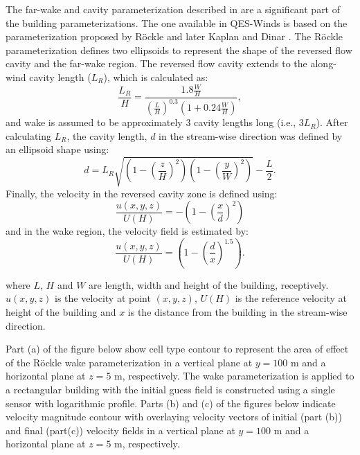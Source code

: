 The far-wake and cavity parameterization described in \cite{singh2005testing,singh2006testing} are a significant part of the building parameterizations. The one available in QES-Winds is based on the parameterization proposed by R\"{o}ckle \cite{rockle1990bestimmung} and later Kaplan and Dinar \cite{kaplan1996lagrangian}. The R\"{o}ckle parameterization defines two ellipsoids to represent the shape of the reversed flow cavity and the far-wake region. The reversed flow cavity extends to the along-wind cavity length
($L_R$), which is calculated as:
\begin{equation}
\frac{L_{R}}{H}=\frac{1.8 \frac{W}{H}}{\left(\frac{L}{H}\right)^{0.3}\left(1+0.24 \frac{W}{H}\right)},
\label{eq:Lr}
\end{equation}
and wake is assumed to be approximately $3$ cavity lengths long (i.e., $3L_R$). After calculating $L_R$, the cavity length, $d$ in the stream-wise direction was defined by an ellipsoid shape using:
\begin{equation}
d=L_{R} \sqrt{\left(1-\left(\frac{z}{H}\right)^{2}\right)\left(1-\left(\frac{y}{W}\right)^{2}\right)}-\frac{L}{2}.
\label{eq:d}
\end{equation}
Finally, the velocity in the reversed cavity zone is defined using:
\begin{equation}
\frac{u(x, y, z)}{U(H)}=-\left(1-\left(\frac{x}{d}\right)^{2}\right)
\label{eq:cavity}
\end{equation}
and in the wake region, the velocity field is estimated by:
\begin{equation}
\frac{u(x, y, z)}{U(H)}=\left(1-\left(\frac{d}{x}\right)^{1.5}\right).
\label{eq:wake}
\end{equation}

where $L$, $H$ and $W$ are length, width and height of the building, receptively. $u(x,y,z)$ is the velocity at point $(x,y,z)$, $U(H)$ is the reference velocity at height of the building and $x$ is the distance from the building in the stream-wise direction.

Part (a) of the figure below show cell type contour to represent the area of effect of the R\"{o}ckle wake parameterization in a vertical plane at $y=100$ m and a horizontal plane at $z=5$ m, respectively. The wake parameterization is applied to a rectangular building with the initial guess field is constructed using a single sensor with logarithmic profile. Parts (b) and (c) of the figures below indicate velocity magnitude contour with overlaying velocity vectors of initial (part (b)) and final (part(c)) velocity fields in a vertical plane at $y=100$ m and a horizontal plane at $z=5$ m, respectively.

